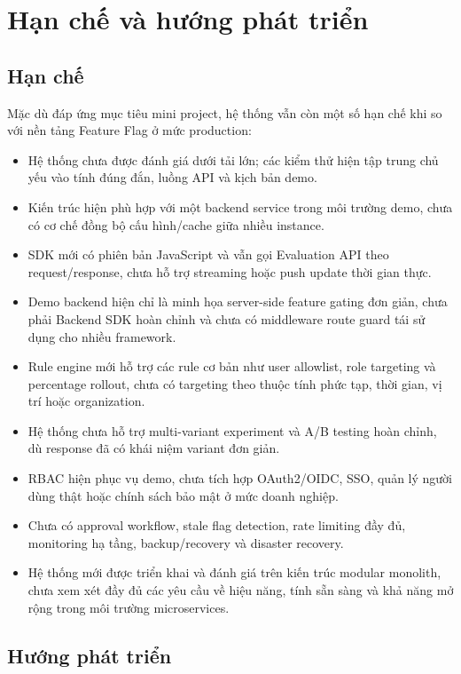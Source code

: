 \section{Hạn chế và hướng phát triển}

\subsection{Hạn chế}

Mặc dù đáp ứng mục tiêu mini project, hệ thống vẫn còn một số hạn chế khi so với nền tảng Feature Flag ở mức production:

\begin{itemize}
    \item Hệ thống chưa được đánh giá dưới tải lớn; các kiểm thử hiện tập trung chủ yếu vào tính đúng đắn, luồng API và kịch bản demo.
    \item Kiến trúc hiện phù hợp với một backend service trong môi trường demo, chưa có cơ chế đồng bộ cấu hình/cache giữa nhiều instance.
    \item SDK mới có phiên bản JavaScript và vẫn gọi Evaluation API theo request/response, chưa hỗ trợ streaming hoặc push update thời gian thực.
    \item Demo backend hiện chỉ là minh họa server-side feature gating đơn giản, chưa phải Backend SDK hoàn chỉnh và chưa có middleware route guard tái sử dụng cho nhiều framework.
    \item Rule engine mới hỗ trợ các rule cơ bản như user allowlist, role targeting và percentage rollout, chưa có targeting theo thuộc tính phức tạp, thời gian, vị trí hoặc organization.
    \item Hệ thống chưa hỗ trợ multi-variant experiment và A/B testing hoàn chỉnh, dù response đã có khái niệm variant đơn giản.
    \item RBAC hiện phục vụ demo, chưa tích hợp OAuth2/OIDC, SSO, quản lý người dùng thật hoặc chính sách bảo mật ở mức doanh nghiệp.
    \item Chưa có approval workflow, stale flag detection, rate limiting đầy đủ, monitoring hạ tầng, backup/recovery và disaster recovery.
    \item Hệ thống mới được triển khai và đánh giá trên kiến trúc modular monolith, chưa xem xét đầy đủ các yêu cầu về hiệu năng, tính sẵn sàng và khả năng mở rộng trong môi trường microservices.
\end{itemize}

\subsection{Hướng phát triển}

